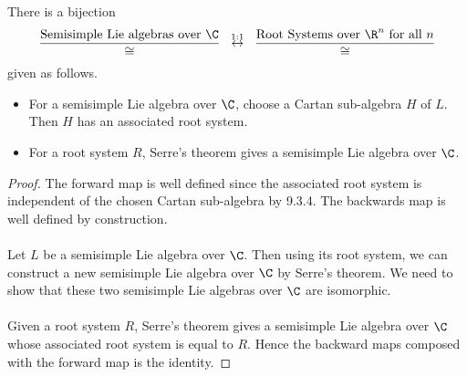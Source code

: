 \documentclass[a4paper]{article}
\begin{document}
\begin{crl}{}{} There is a bijection $$\frac{\text{Semisimple Lie algebras over }\C}{\cong}\;\;\overset{1:1}{\leftrightarrow}\;\;\frac{\text{Root Systems over }\R^n\text{ for all }n}{\cong}$$ given as follows. 
\begin{itemize}
\item For a semisimple Lie algebra over $\C$, choose a Cartan sub-algebra $H$ of $L$. Then $H$ has an associated root system. 
\item For a root system $R$, Serre's theorem gives a semisimple Lie algebra over $\C$. 
\end{itemize} \tcbline
\begin{proof}
The forward map is well defined since the associated root system is independent of the chosen Cartan sub-algebra by 9.3.4. The backwards map is well defined by construction. \\~\\

Let $L$ be a semisimple Lie algebra over $\C$. Then using its root system, we can construct a new semisimple Lie algebra over $\C$ by Serre's theorem. We need to show that these two semisimple Lie algebras over $\C$ are isomorphic. \\~\\

Given a root system $R$, Serre's theorem gives a semisimple Lie algebra over $\C$ whose associated root system is equal to $R$. Hence the backward maps composed with the forward map is the identity. 
\end{proof}
\end{crl}
\end{document}
